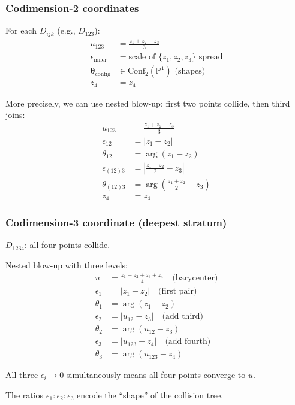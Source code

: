 \begin{example}
\subsubsection{Codimension-2 coordinates}

For each $D_{ijk}$ (e.g., $D_{123}$):
\begin{align}
u_{123} &= \frac{z_1 + z_2 + z_3}{3}\\
\epsilon_{\text{inner}} &= \text{scale of } \{z_1, z_2, z_3\} \text{ spread}\\
\boldsymbol{\theta}_{\text{config}} &\in \text{Conf}_2(\mathbb{P}^1) \text{ (shapes)}\\
z_4 &= z_4
\end{align}

More precisely, we can use nested blow-up: first two points collide, then third joins:
\begin{align}
u_{123} &= \frac{z_1 + z_2 + z_3}{3}\\
\epsilon_{12} &= |z_1 - z_2|\\
\theta_{12} &= \arg(z_1 - z_2)\\
\epsilon_{(12)3} &= \left| \frac{z_1 + z_2}{2} - z_3 \right|\\
\theta_{(12)3} &= \arg\left(\frac{z_1 + z_2}{2} - z_3\right)\\
z_4 &= z_4
\end{align}

\subsubsection{Codimension-3 coordinate (deepest stratum)}

$D_{1234}$: all four points collide.

Nested blow-up with three levels:
\begin{align}
u &= \frac{z_1 + z_2 + z_3 + z_4}{4} \quad \text{(barycenter)}\\
\epsilon_1 &= |z_1 - z_2| \quad \text{(first pair)}\\
\theta_1 &= \arg(z_1 - z_2)\\
\epsilon_2 &= |u_{12} - z_3| \quad \text{(add third)}\\
\theta_2 &= \arg(u_{12} - z_3)\\
\epsilon_3 &= |u_{123} - z_4| \quad \text{(add fourth)}\\
\theta_3 &= \arg(u_{123} - z_4)
\end{align}

All three $\epsilon_i \to 0$ simultaneously means all four points converge to $u$.

The ratios $\epsilon_1 : \epsilon_2 : \epsilon_3$ encode the ``shape'' of the collision tree.
\end{example}

